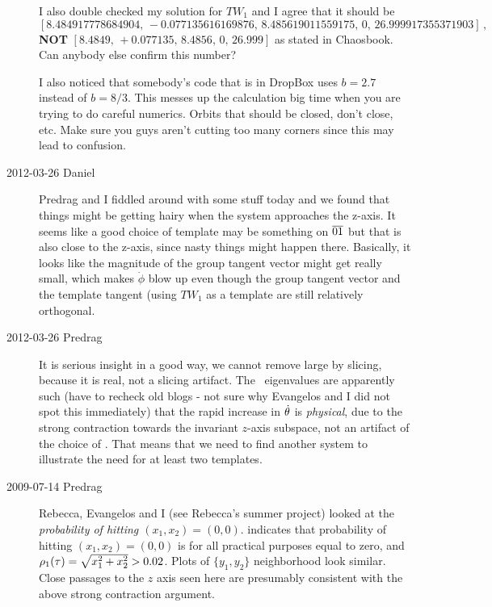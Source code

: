 \begin{description}
I also double checked my solution for $TW_1$ and I agree that it should be
\[
[8.484917778684904, \,-0.077135616169876,\,8.485619011559175,\,0,\,26.999917355371903]
\,,
\]
{\bf NOT} $[8.4849,\,+0.077135,\,8.4856,\,0,\,26.999]$ as stated in
 Chaosbook. Can anybody else confirm this number?                       \toCB

I also noticed that somebody's code that is in DropBox uses $b = 2.7$
instead of $b = 8/3$. This messes up the calculation big time when you
are trying to do careful numerics. Orbits that should be closed, don't
close, etc. Make sure you guys aren't cutting too many corners since this
may lead to confusion.

\item[2012-03-26 Daniel]
Predrag and I fiddled around with some stuff today and we found that
things might be getting hairy when the system approaches the z-axis. It
seems like a good choice of template may be something on $\overline{01}$
but that is also close to the z-axis, since nasty things might happen
there. Basically, it looks like the magnitude of the group tangent vector
might get really small, which makes $\dot{\phi}$ blow up even though the
group tangent vector and the template tangent (using $TW_1$ as a template
are still relatively orthogonal.

\item[2012-03-26 Predrag] It is serious insight in a good way, we cannot remove
large {\phaseVel} by slicing, because it is real, not a slicing artifact.
The \eqv\ eigenvalues are apparently such (have to recheck old blogs -
not sure why Evangelos and I did not spot this immediately) that the
rapid increase in {\phaseVel} $\dot{\theta}$ is \emph{physical}, due to
the strong contraction towards the invariant $z$-axis subspace, not an
artifact of the choice of \slice. That means that we need to find another
system to illustrate the need for at least two templates.

\item[2009-07-14 Predrag] Rebecca, Evangelos and I (see
 {Rebecca's summer project})
looked at the {\em probability of hitting $(x_1,x_2) =(0,0)$}.
 indicates that probability of hitting
$(x_1,x_2) =(0,0)$ is for all practical purposes equal to zero, and
$\rho_1(\tau)=\sqrt{x_1^2+x_2^2} > 0.02$. Plots of $\{y_1,y_2\}$
neighborhood look similar. Close passages to the $z$ axis seen here
are presumably consistent with the above strong contraction argument.


\end{description}
